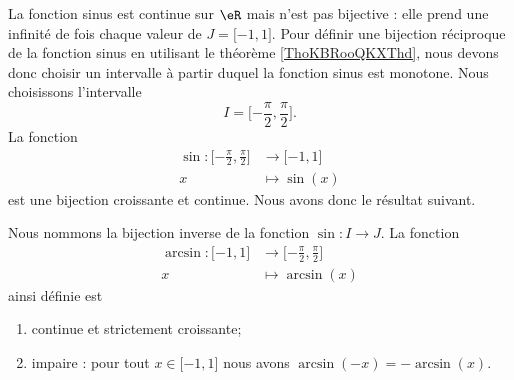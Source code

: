 La fonction sinus est continue sur \( \eR\) mais n'est pas bijective : elle prend une infinité de fois chaque valeur de \( J=\mathopen[ -1 , 1 \mathclose]\). Pour définir une bijection réciproque de la fonction sinus en utilisant le théorème \ref{ThoKBRooQKXThd}, nous devons donc choisir un intervalle à partir duquel la fonction sinus est monotone. Nous choisissons l'intervalle
\begin{equation}
    I=\mathopen[ -\frac{ \pi }{ 2 } , \frac{ \pi }{2} \mathclose].
\end{equation}
La fonction
\begin{equation}
    \begin{aligned}
        \sin\colon \mathopen[ -\frac{ \pi }{2} , \frac{ \pi }{2} \mathclose]&\to \mathopen[ -1 , 1 \mathclose] \\
        x&\mapsto \sin(x) 
    \end{aligned}
\end{equation}
est une bijection croissante et continue. Nous avons donc le résultat suivant.
\begin{theorem}
    Nous nommons  la bijection inverse de la fonction \( \sin\colon I\to J\). La fonction
    \begin{equation}
        \begin{aligned}
            \arcsin\colon \mathopen[ -1 , 1 \mathclose]&\to \mathopen[ -\frac{ \pi }{2} , \frac{ \pi }{2} \mathclose] \\
            x&\mapsto \arcsin(x) 
        \end{aligned}
    \end{equation}
    ainsi définie est
    \begin{enumerate}
        \item
            continue et strictement croissante;
        \item
            impaire : pour tout \( x\in\mathopen[ -1 , 1 \mathclose]\) nous avons \( \arcsin(-x)=-\arcsin(x)\).
    \end{enumerate}
\end{theorem}

